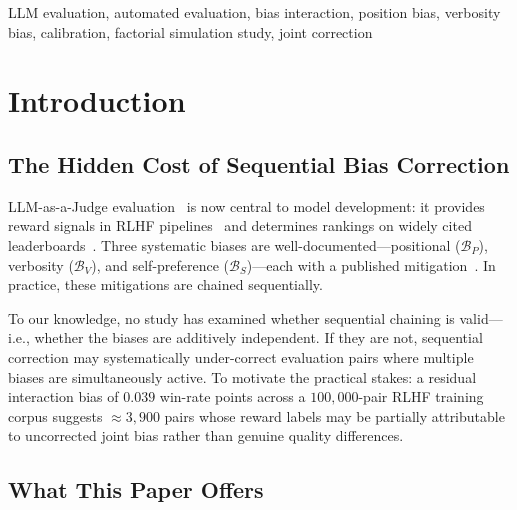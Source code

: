 \documentclass[10pt,conference]{IEEEtran}
\newcommand{\BP}{\mathcal{B}_P}
\newcommand{\BV}{\mathcal{B}_V}
\newcommand{\BS}{\mathcal{B}_S}
\begin{document}
\begin{IEEEkeywords}
LLM evaluation, automated evaluation, bias interaction,
position bias, verbosity bias, calibration,
factorial simulation study, joint correction
\end{IEEEkeywords}

\section{Introduction}
\label{sec:intro}

\subsection{The Hidden Cost of Sequential Bias Correction}

LLM-as-a-Judge evaluation~\cite{zheng2023judging} is now
central to model development: it provides reward signals
in RLHF pipelines~\cite{sharma2023sycophancy} and determines
rankings on widely cited leaderboards~\cite{dubois2024length}.
Three systematic biases are well-documented---positional ($\BP$),
verbosity ($\BV$), and self-preference ($\BS$)---each with
a published mitigation~\cite{zheng2023judging,dubois2024length,
panickssery2024llm}.
In practice, these mitigations are chained sequentially.

To our knowledge, no study has examined whether sequential
chaining is valid---i.e., whether the biases are additively
independent.
If they are not, sequential correction may systematically
under-correct evaluation pairs where multiple biases
are simultaneously active.
To motivate the practical stakes: a residual interaction bias
of $0.039$ win-rate points across a $100{,}000$-pair RLHF
training corpus suggests ${\approx}3{,}900$ pairs whose
reward labels may be partially attributable to uncorrected
joint bias rather than genuine quality differences.

\subsection{What This Paper Offers}
\end{document}
